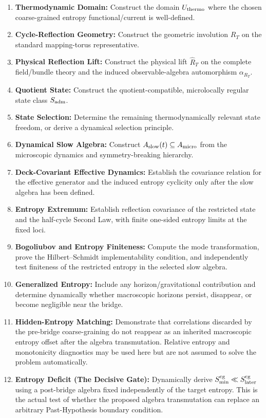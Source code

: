 \documentclass[11pt]{article}
\theoremstyle{canonmath}
\theoremstyle{canonpostulate}
\theoremstyle{canonclaim}
\def\mathcal#1{#1}%
\begin{document}
\begin{enumerate}
\begin{enumerate}[label=\textbf{OP-22\alph*.}, leftmargin=*, itemsep=0.1em]
    \item \textbf{Thermodynamic Domain:} Construct the domain $U_{\rm thermo}$ where the chosen coarse-grained entropy functional/current is well-defined.
    \item \textbf{Cycle-Reflection Geometry:} Construct the geometric involution $R_T$ on the standard mapping-torus representative.
    \item \textbf{Physical Reflection Lift:} Construct the physical lift $\widehat R_T$ on the complete field/bundle theory and the induced observable-algebra automorphism $\alpha_{R_T}$.
    \item \textbf{Quotient State:} Construct the quotient-compatible, microlocally regular state class $\mathcal S_{\rm adm}$.
    \item \textbf{State Selection:} Determine the remaining thermodynamically relevant state freedom, or derive a dynamical selection principle.
    \item \textbf{Dynamical Slow Algebra:} Construct $\mathcal A_{\rm slow}(t)\subseteq\mathcal A_{\rm micro}$ from the microscopic dynamics and symmetry-breaking hierarchy.
    \item \textbf{Deck-Covariant Effective Dynamics:} Establish the covariance relation for the effective generator and the induced entropy cyclicity only after the slow algebra has been defined.
    \item \textbf{Entropy Extremum:} Establish reflection covariance of the restricted state and the half-cycle Second Law, with finite one-sided entropy limits at the fixed loci.
    \item \textbf{Bogoliubov and Entropy Finiteness:} Compute the mode transformation, prove the Hilbert--Schmidt implementability condition, and independently test finiteness of the restricted entropy in the selected slow algebra.
    \item \textbf{Generalized Entropy:} Include any horizon/gravitational contribution and determine dynamically whether macroscopic horizons persist, disappear, or become negligible near the bridge.
    \item \textbf{Hidden-Entropy Matching:} Demonstrate that correlations discarded by the pre-bridge coarse-graining do not reappear as an inherited macroscopic entropy offset after the algebra transmutation. Relative entropy and monotonicity diagnostics may be used here but are not assumed to solve the problem automatically.
    \item \textbf{Entropy Deficit (The Decisive Gate):} Dynamically derive $S_{\min}^{\rm cg}\ll S_{\rm later}^{\rm cg}$ using a post-bridge algebra fixed independently of the target entropy. This is the actual test of whether the proposed algebra transmutation can replace an arbitrary Past-Hypothesis boundary condition.

\end{enumerate}
\end{enumerate}
\end{document}
